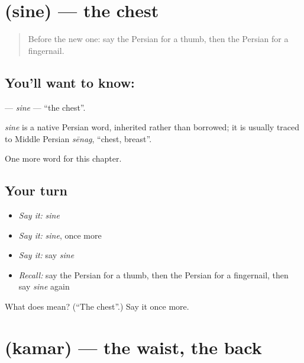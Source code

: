 \section[\texorpdfstring{\fa{سینه} (sine)}{سینه (sine)}]{ (sine) — the chest}

\label{lesson:FA-C108-sine}



\begin{quote}
Before the new one: say the Persian for a thumb, then the Persian for a fingernail.
\end{quote}

\subsection*{You'll want to know: }
\textbf{} — \emph{sine} — \textquotedblleft{}the chest\textquotedblright{}.

\begin{cousinweb}
\emph{sine} is a native Persian word, inherited rather than borrowed; it is usually traced to Middle Persian \emph{sēnag}, \textquotedblleft{}chest, breast\textquotedblright{}.
\end{cousinweb}

\begin{grammarlens}[title={What you've built}]
One more word for this chapter.
\end{grammarlens}

\subsection*{Your turn}
\begin{itemize}
\raggedright
  \item \emph{Say it:} \emph{sine}
  \item \emph{Say it:} \emph{sine}, once more
  \item \emph{Say it:} say \emph{sine}
  \item \emph{Recall:} say the Persian for a thumb, then the Persian for a fingernail, then say \emph{sine} again
\end{itemize}

\begin{tcolorbox}[breakable,colback=teal!4,colframe=teal!35!black,title={Before you move on}]
What does  mean? (\textquotedblleft{}The chest\textquotedblright{}.) Say it once more.
\end{tcolorbox}
\section[\texorpdfstring{\fa{کمر} (kamar)}{کمر (kamar)}]{ (kamar) — the waist, the back}

